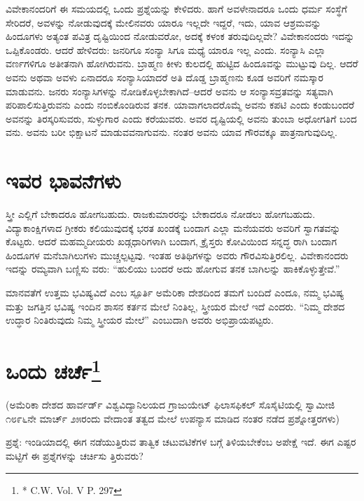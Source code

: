 ವಿವೇಕಾನಂದರಿಗೆ ಈ ಸಮಯದಲ್ಲಿ ಒಂದು ಪ್ರಶ್ನೆಯನ್ನು ಕೇಳಿದರು. ಹಾಗೆ ಅವಳೇನಾದರೂ ಒಂದು ಧರ್ಮ ಸಂಸ್ಥೆಗೆ ಸೇರಿದರೆ, ಅವಳನ್ನು ನೋಡುವುದಕ್ಕೆ ಮೇಲಿನವರು ಯಾರೂ ಇಲ್ಲದೇ ಇದ್ದರೆ, ಇದು, ಯಾವ ಆಶ್ರಮವನ್ನು ಹಿಂದೂಗಳು ಅತ್ಯಂತ ಪವಿತ್ರ ದೃಷ್ಟಿಯಿಂದ ನೋಡುವರೋ, ಅದಕ್ಕೆ ಕಳಂಕ ತರುವುದಿಲ್ಲವೇ? ವಿವೇಕಾನಂದರು ಇದನ್ನು ಒಪ್ಪಿಕೊಂಡರು. ಆದರೆ ಹೇಳಿದರು: ಜನರಿಗೂ ಸಂನ್ಯಾ ಸಿಗೂ ಮಧ್ಯೆ ಯಾರೂ ಇಲ್ಲ ಎಂದು. ಸಂನ್ಯಾಸಿ ಎಲ್ಲಾ ವರ್ಣಗಳಿಗೂ ಅತೀತನಾಗಿ ಹೋಗಿರುವನು. ಬ್ರಾಹ್ಮಣ ಕೀಳು ಕುಲದಲ್ಲಿ ಹುಟ್ಟಿದ ಹಿಂದೂವನ್ನು ಮುಟ್ಟುವು ದಿಲ್ಲ. ಆದರೆ ಅವನು ಅಥವಾ ಅವಳು ಏನಾದರೂ ಸಂನ್ಯಾಸಿಯಾದರೆ ಅತಿ ದೊಡ್ಡ ಬ್ರಾಹ್ಮಣನು ಕೂಡ ಅವರಿಗೆ ನಮಸ್ಕಾರ ಮಾಡುವನು. ಜನರು ಸಂನ್ಯಾಸಿಗಳನ್ನು ನೋಡಿಕೊಳ್ಳಬೇಕಾಗಿದೆ–ಆದರೆ ಅವನು ಆ ಸಂನ್ಯಾಸವ್ರತವನ್ನು ಸತ್ಯವಾಗಿ ಪರಿಪಾಲಿಸುತ್ತಿರುವನು ಎಂದು ನಂಬಿಕೊಂಡಿರುವ ತನಕ. ಯಾವಾಗಲಾದರೊಮ್ಮೆ ಅವನು ಕಪಟಿ ಎಂದು ಕಂಡುಬಂದರೆ ಅವನನ್ನು ತಿರಸ್ಕರಿಸುವರು, ಸುಳ್ಳುಗಾರ ಎಂದು ಕರೆಯುವರು. ಅವರ ದೃಷ್ಟಿಯಲ್ಲಿ ಅವನು ತುಂಬಾ ಅಧೋಗತಿಗೆ ಬಂದ ವನು. ಅವನು ಬರೀ ಭಿಕ್ಷಾಟನೆ ಮಾಡುವವನಾಗುವನು. ನಂತರ ಅವನು ಯಾವ ಗೌರವಕ್ಕೂ ಪಾತ್ರನಾಗುವುದಿಲ್ಲ.


\section{ಇವರ ಭಾವನೆಗಳು}

ಸ್ತ್ರೀ ಎಲ್ಲಿಗೆ ಬೇಕಾದರೂ ಹೋಗಬಹುದು. ರಾಜಕುಮಾರರನ್ನು ಬೇಕಾದರೂ ನೋಡಲು ಹೋಗಬಹುದು. ವಿದ್ಯಾಕಾಂಕ್ಷಿಗಳಾದ ಗ್ರೀಕರು ಕಲಿಯುವುದಕ್ಕೆ ಭರತ ಖಂಡಕ್ಕೆ ಬಂದಾಗ ಎಲ್ಲಾ ಮನೆಯವರು ಅವರಿಗೆ ಸ್ವಾಗತವನ್ನು ಕೊಟ್ಟರು. ಆದರೆ ಮಹಮ್ಮದೀಯರು ಖಡ್ಗಧಾರಿಗಳಾಗಿ ಬಂದಾಗ, ಕ್ರೈಸ್ತರು ಕೋವಿಯಿಂದ ಸನ್ನದ್ಧ ರಾಗಿ ಬಂದಾಗ ಹಿಂದೂಗಳ ಮನೆಬಾಗಿಲುಗಳು ಮುಚ್ಚಲ್ಪಟ್ಟವು. ಇಂತಹ ಅತಿಥಿಗಳನ್ನು ಅವರು ಗೌರವಿಸುತ್ತಿರಲಿಲ್ಲ. ವಿವೇಕಾನಂದರು ಇದನ್ನು ರಮ್ಯವಾಗಿ ಬಣ್ಣಿಸು ವರು: “ಹುಲಿಯು ಬಂದರೆ ಅದು ಹೋಗುವ ತನಕ ಬಾಗಿಲನ್ನು ಹಾಕಿಕೊಳ್ಳುತ್ತೇವೆ.”

ಮಾನವತೆಗೆ ಉತ್ತಮ ಭವಿಷ್ಯವಿದೆ ಎಂಬ ಸ್ಪೂರ್ತಿ ಅಮೆರಿಕಾ ದೇಶದಿಂದ ತಮಗೆ ಬಂದಿದೆ ಎಂದೂ, ನಮ್ಮ ಭವಿಷ್ಯ ಮತ್ತು ಜಗತ್ತಿನ ಭವಿಷ್ಯ ಇಂದಿನ ಶಾಸನ ಕರ್ತನ ಮೇಲೆ ನಿಂತಿಲ್ಲ, ಸ್ತ್ರೀಯರ ಮೇಲೆ ಇದೆ ಎಂದರು. “ನಿಮ್ಮ ದೇಶದ ಉದ್ಧಾರ ನಿಂತಿರುವುದು ನಿಮ್ಮ ಸ್ತ್ರೀಯರ ಮೇಲೆ” ಎಂಬುದಾಗಿ ಅವರು ಅಭಿಪ್ರಾಯಪಟ್ಟರು.


\section[ಒಂದು ಚರ್ಚೆ]{ಒಂದು ಚರ್ಚೆ\protect\footnote{* C.W. Vol. V P. 297}}

\begin{center}
(ಅಮೆರಿಕಾ ದೇಶದ ಹಾರ್ವರ್ಡ್​ ವಿಶ್ವವಿದ್ಯಾನಿಲಯದ ಗ್ರಾಜುಯೇಟ್​ ಫಿಲಾಸಫಿಕಲ್​ ಸೊಸೈಟಿಯಲ್ಲಿ ಸ್ವಾಮೀಜಿ ೧೮೯೬ನೇ ಮಾರ್ಚ್​ ೨೫ರಂದು ವೇದಾಂತ ತತ್ವದ ಮೇಲೆ ಉಪನ್ಯಾಸ ಮಾಡಿದ ನಂತರ ನಡೆದ ಪ್ರಶ್ನೋತ್ತರಗಳು)
\end{center}

ಪ್ರಶ್ನೆ: ಇಂಡಿಯಾದಲ್ಲಿ ಈಗ ನಡೆಯುತ್ತಿರುವ ತಾತ್ವಿಕ ಚಟುವಟಿಕೆಗಳ ಬಗ್ಗೆ ತಿಳಿಯಬೇಕೆಂಬ ಅಪೇಕ್ಷೆ ಇದೆ. ಈಗ ಎಷ್ಟರ ಮಟ್ಟಿಗೆ ಈ ಪ್ರಶ್ನೆಗಳನ್ನು ಚರ್ಚಿಸು ತ್ತಿರುವರು?

